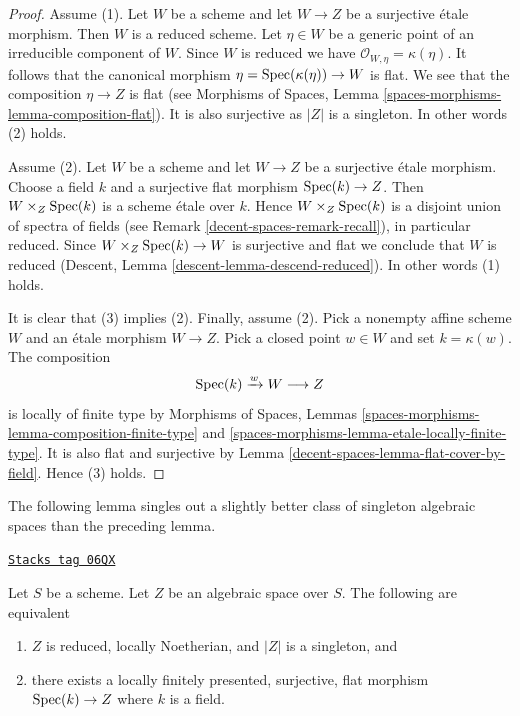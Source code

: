 \begin{proof}
Assume (1). Let $W$ be a scheme and
let $W \to Z$ be a surjective \'etale morphism. Then $W$ is
a reduced scheme. Let $\eta \in W$ be a generic point of an irreducible
component of $W$. Since $W$ is reduced we have
$\mathcal{O}_{W, \eta} = \kappa(\eta)$. It follows that the canonical
morphism $\eta = \operatorname{Spec}(\kappa(\eta)) \to W$ is flat. We see that the
composition $\eta \to Z$ is flat (see
Morphisms of Spaces, Lemma \ref{spaces-morphisms-lemma-composition-flat}).
It is also surjective as $|Z|$ is a singleton. In other words
(2) holds.

\medskip\noindent
Assume (2). Let $W$ be a scheme and
let $W \to Z$ be a surjective \'etale morphism. Choose a field
$k$ and a surjective flat morphism $\operatorname{Spec}(k) \to Z$.
Then $W \times_Z \operatorname{Spec}(k)$ is a scheme \'etale over $k$.
Hence $W \times_Z \operatorname{Spec}(k)$ is a disjoint union of spectra of fields
(see Remark \ref{decent-spaces-remark-recall}), in particular reduced. Since
$W \times_Z \operatorname{Spec}(k) \to W$
is surjective and flat we conclude that $W$ is reduced
(Descent, Lemma \ref{descent-lemma-descend-reduced}).
In other words (1) holds.

\medskip\noindent
It is clear that (3) implies (2). Finally, assume (2). Pick a nonempty
affine scheme $W$ and an \'etale morphism $W \to Z$. Pick a closed
point $w \in W$ and set $k = \kappa(w)$. The composition
$$
\operatorname{Spec}(k) \xrightarrow{w} W \longrightarrow Z
$$
is locally of finite type by
Morphisms of Spaces, Lemmas
\ref{spaces-morphisms-lemma-composition-finite-type} and
\ref{spaces-morphisms-lemma-etale-locally-finite-type}.
It is also flat and surjective by
Lemma \ref{decent-spaces-lemma-flat-cover-by-field}.
Hence (3) holds.
\end{proof}

The following lemma singles out a slightly better class of singleton
algebraic spaces than the preceding lemma.

\begin{lemma}
\label{decent-spaces-lemma-unique-point-better}
\href{https://stacks.math.columbia.edu/tag/06QX}{\texttt{Stacks tag 06QX}}

Let $S$ be a scheme. Let $Z$ be an algebraic space over $S$.
The following are equivalent
\begin{enumerate}
\item $Z$ is reduced, locally Noetherian, and $|Z|$
is a singleton, and
\item there exists a locally finitely presented, surjective, flat morphism
$\operatorname{Spec}(k) \to Z$ where $k$ is a field.
\end{enumerate}
\end{lemma}

